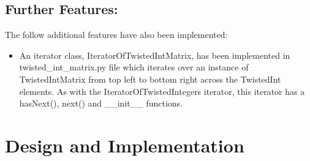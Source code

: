 \documentclass[11]{article}
\begin{document}
	\subsection{Further Features:}
		The follow additional features have also been implemented:
		\begin{itemize}
			\item An iterator class, IteratorOfTwistedIntMatrix, has been implemented in twisted\_int\_matrix.py file which iterates over an instance of TwistedIntMatrix from top left to bottom right across the TwistedInt elements. As with the IteratorOfTwistedIntegers iterator, this iterator has a hasNext(), next() and \_\_init\_\_ functions.
		\end{itemize}

	\section{Design and Implementation}
\end{document}
